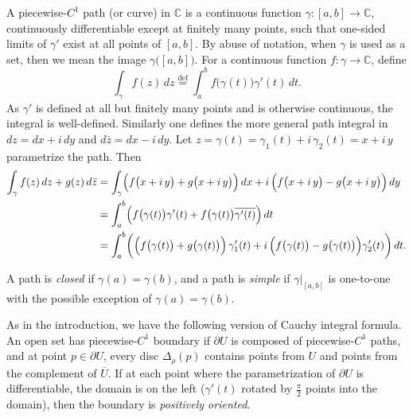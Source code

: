 \documentclass[12pt,openany]{book}
\newcommand{\C}{{\mathbb{C}}}
\newcommand{\myindex}[1]{#1\index{#1}}
\theoremstyle{plain}
\theoremstyle{remark}
\theoremstyle{definition}
\theoremstyle{exercise}
\theoremstyle{example}
\begin{document}
A piecewise-$C^1$ path (or curve) in $\C$
is a continuous function $\gamma \colon [a,b] \to \C$,
continuously differentiable except at finitely many points,
such that one-sided limits of $\gamma'$ exist at all points of $[a,b]$.
By abuse of notation, when $\gamma$ is used as a set, then we mean
the image
$\gamma\bigl([a,b]\bigr)$.
For a continuous function $f \colon \gamma \to \C$, define
%
\begin{equation*}
\int_\gamma f(z) \, dz 
\overset{\text{def}}{=}
\int_a^b f\bigl(\gamma(t)\bigr) \gamma'(t) \, dt .
\end{equation*}
As $\gamma'$ is defined at all but finitely many points and is otherwise
continuous, the integral is well-defined.  Similarly one defines the more general
path integral in $dz = dx + i\,dy$ and $d\bar{z} = dx - i\, dy$.
Let
$z = \gamma(t) = \gamma_1(t) + i \, \gamma_2(t) = x + i\, y$
parametrize the path.  Then
\begin{equation*}
\begin{split}
\int_\gamma f(z) \, dz + g(z) \, d\bar{z}
& =
\int_\gamma
\Bigl(f\bigl(x+i\, y\bigr) + g\bigl(x+i\, y\bigr) \Bigr) \, dx
+
i \, \Bigl( f\bigl(x+i\, y\bigr) - g\bigl(x+i\, y\bigr) \Bigr) \, dy
\\
& =
\int_a^b
\Bigl(
f\bigl(\gamma(t)\bigr) \gamma'(t)
+
f\bigl(\gamma(t)\bigr) \overline{\gamma'(t)}
\Bigr) \, dt
\\
& =
\int_a^b
\biggl(
\Bigl(f\bigl(\gamma(t)\bigr) + g\bigl(\gamma(t)\bigr) \Bigr) \,
\gamma_1'(t)
+
i \, \Bigl( f\bigl(\gamma(t)\bigr) - g\bigl(\gamma(t)\bigr) \Bigr)
\gamma_2'(t)
\biggr)
\, dt .
\end{split}
\end{equation*}

A path is \emph{closed}
if $\gamma(a) = \gamma(b)$,
and a path is \emph{simple}
if $\gamma|_{[a,b]}$ is one-to-one
with the possible exception of $\gamma(a) = \gamma(b)$.

As in the introduction, we have the following version of Cauchy integral
formula.  An open set has piecewise-$C^1$ boundary if $\partial U$
is composed of piecewise-$C^1$ paths, and at point $p \in \partial U$,
every disc $\Delta_\rho(p)$ contains points from $U$ and points from the
complement of $\overline{U}$.  If 
at each point where the parametrization of $\partial U$ is differentiable,
the domain is on the left ($\gamma'(t)$ rotated by $\frac{\pi}{2}$ points into the
domain), then the boundary is \emph{\myindex{positively oriented}}.
\end{document}
